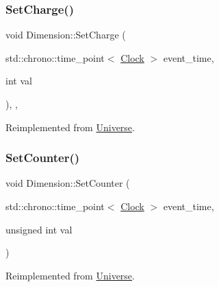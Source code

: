 \mbox{\label{classDimension_a6d3f7fa4a26b92d8ae6161a1b8bb8220}} 
\subsubsection{\texorpdfstring{Set\+Charge()}{SetCharge()}}
{\footnotesize\ttfamily void Dimension\+::\+Set\+Charge (\begin{DoxyParamCaption}\item[{std\+::chrono\+::time\+\_\+point$<$ \mbox{\hyperlink{universe_8h_a0ef8d951d1ca5ab3cfaf7ab4c7a6fd80}{Clock}} $>$}]{event\+\_\+time,  }\item[{int}]{val }\end{DoxyParamCaption})\hspace{0.3cm}{\ttfamily [inline]}, {\ttfamily [final]}, {\ttfamily [virtual]}}



Reimplemented from \mbox{\hyperlink{classUniverse_a3b3da7c86a7b75e5e5c0b7972ac82a87}{Universe}}.

\mbox{\label{classDimension_a75c6a1a1e09c40b5860dc11a83384d9f}} 
\subsubsection{\texorpdfstring{Set\+Counter()}{SetCounter()}}
{\footnotesize\ttfamily void Dimension\+::\+Set\+Counter (\begin{DoxyParamCaption}\item[{std\+::chrono\+::time\+\_\+point$<$ \mbox{\hyperlink{universe_8h_a0ef8d951d1ca5ab3cfaf7ab4c7a6fd80}{Clock}} $>$}]{event\+\_\+time,  }\item[{unsigned int}]{val }\end{DoxyParamCaption})\hspace{0.3cm}{\ttfamily [virtual]}}



Reimplemented from \mbox{\hyperlink{classUniverse_aa22202ae740eb1355529afcb13285e91}{Universe}}.

\mbox{\label{classDimension_ad8c18ce6358904e01594092dca9f1311}} 
